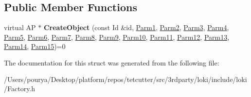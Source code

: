 \subsection*{Public Member Functions}
\begin{DoxyCompactItemize}
\item 
\hypertarget{structLoki_1_1FactoryImpl_3_01AP_00_01Id_00_01LOKI__TYPELIST__15_07P1_00_01P2_00_01P3_00_01P4_00409b4228cd5dfbe237d6d4489608665a_a53acfa451d3293f0912fcc9679bff1fa}{}virtual A\+P $\ast$ {\bfseries Create\+Object} (const Id \&id, \hyperlink{classLoki_1_1EmptyType}{Parm1}, \hyperlink{classLoki_1_1EmptyType}{Parm2}, \hyperlink{classLoki_1_1EmptyType}{Parm3}, \hyperlink{classLoki_1_1EmptyType}{Parm4}, \hyperlink{classLoki_1_1EmptyType}{Parm5}, \hyperlink{classLoki_1_1EmptyType}{Parm6}, \hyperlink{classLoki_1_1EmptyType}{Parm7}, \hyperlink{classLoki_1_1EmptyType}{Parm8}, \hyperlink{classLoki_1_1EmptyType}{Parm9}, \hyperlink{classLoki_1_1EmptyType}{Parm10}, \hyperlink{classLoki_1_1EmptyType}{Parm11}, \hyperlink{classLoki_1_1EmptyType}{Parm12}, \hyperlink{classLoki_1_1EmptyType}{Parm13}, \hyperlink{classLoki_1_1EmptyType}{Parm14}, \hyperlink{classLoki_1_1EmptyType}{Parm15})=0\label{structLoki_1_1FactoryImpl_3_01AP_00_01Id_00_01LOKI__TYPELIST__15_07P1_00_01P2_00_01P3_00_01P4_00409b4228cd5dfbe237d6d4489608665a_a53acfa451d3293f0912fcc9679bff1fa}

\end{DoxyCompactItemize}


The documentation for this struct was generated from the following file\+:\begin{DoxyCompactItemize}
\item 
/\+Users/pourya/\+Desktop/platform/repos/tetcutter/src/3rdparty/loki/include/loki/Factory.\+h\end{DoxyCompactItemize}
